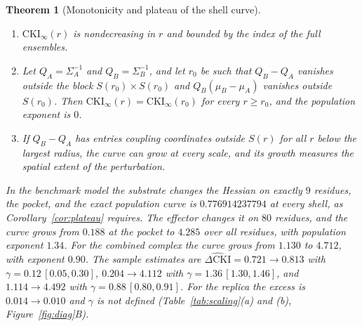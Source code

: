 \documentclass[11pt,reqno]{amsart}
\theoremstyle{plain}
\newtheorem{theorem}{Theorem}[section]
\theoremstyle{definition}
\theoremstyle{remark}
\numberwithin{equation}{section}
\newcommand{\DCKI}{\Delta\mathrm{CKI}}
\begin{document}
\begin{theorem}[Monotonicity and plateau of the shell curve]\label{thm:shell}
\begin{enumerate}[label=\textup{(\arabic*)},leftmargin=*]
\item $\mathrm{CKI}_\infty(r)$ is nondecreasing in $r$ and bounded by the index of the full ensembles.
\item Let $Q_A=\Sigma_A^{-1}$ and $Q_B=\Sigma_B^{-1}$, and let $r_0$ be such that $Q_B-Q_A$ vanishes outside the block $S(r_0)\times S(r_0)$ and $Q_B(\mu_B-\mu_A)$ vanishes outside $S(r_0)$. Then $\mathrm{CKI}_\infty(r)=\mathrm{CKI}_\infty(r_0)$ for every $r\ge r_0$, and the population exponent is $0$.
\item If $Q_B-Q_A$ has entries coupling coordinates outside $S(r)$ for all $r$ below the largest radius, the curve can grow at every scale, and its growth measures the spatial extent of the perturbation.
\end{enumerate}
In the benchmark model the substrate changes the Hessian on exactly $9$ residues, the pocket, and the exact population curve is $0.776914237794$ at every shell, as Corollary~\ref{cor:plateau} requires. The effector changes it on $80$ residues, and the curve grows from $0.188$ at the pocket to $4.285$ over all residues, with population exponent $1.34$. For the combined complex the curve grows from $1.130$ to $4.712$, with exponent $0.90$. The sample estimates are $\widehat{\DCKI}=0.721\to0.813$ with $\gamma=0.12\,[0.05,0.30]$, $0.204\to4.112$ with $\gamma=1.36\,[1.30,1.46]$, and $1.114\to4.492$ with $\gamma=0.88\,[0.80,0.91]$. For the replica the excess is $0.014\to0.010$ and $\gamma$ is not defined (Table~\ref{tab:scaling}(a) and (b), Figure~\ref{fig:diag}B).
\end{theorem}
\end{document}
